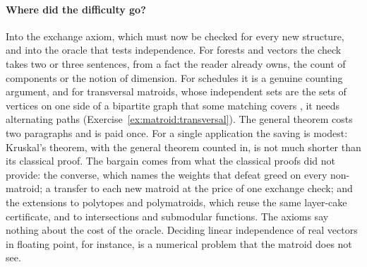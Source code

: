 \begin{refsection}
\paragraph{Where did the difficulty go?} Into the exchange axiom, which must now be checked for every new structure, and into the oracle that tests independence. For forests and vectors the check takes two or three sentences, from a fact the reader already owns, the count of components or the notion of dimension. For schedules it is a genuine counting argument, and for transversal matroids, whose independent sets are the sets of vertices on one side of a bipartite graph that some matching covers \parencite{EdmondsFulkerson1965}, it needs alternating paths (Exercise~\ref{ex:matroid:transversal}). The general theorem costs two paragraphs and is paid once. For a single application the saving is modest: Kruskal's theorem, with the general theorem counted in, is not much shorter than its classical proof. The bargain comes from what the classical proofs did not provide: the converse, which names the weights that defeat greed on every non-matroid; a transfer to each new matroid at the price of one exchange check; and the extensions to polytopes and polymatroids, which reuse the same layer-cake certificate, and to intersections and submodular functions. The axioms say nothing about the cost of the oracle. Deciding linear independence of real vectors in floating point, for instance, is a numerical problem that the matroid does not see.


\end{refsection}
